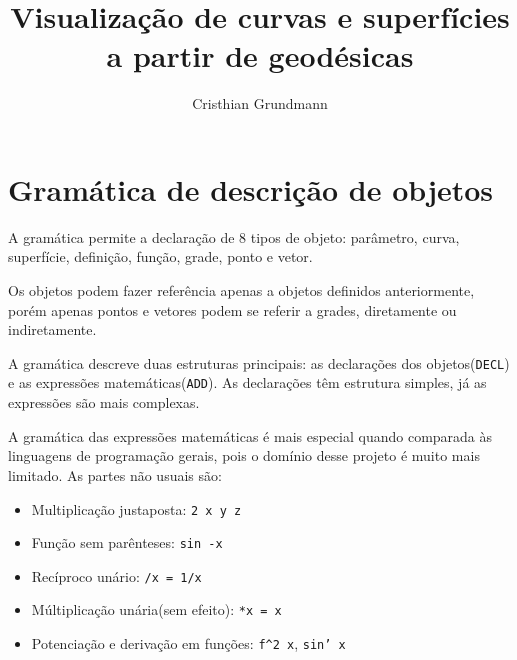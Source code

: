 \documentclass[10pt,a4paper,final]{article}
\author{Cristhian Grundmann}
\title{Visualização de curvas e superfícies a partir de geodésicas}
\begin{document}
\maketitle

\tableofcontents
\lstlistoflistings
\listoffigures
\listoftables


\section{Gramática de descrição de objetos}
A gramática permite a declaração de 8 tipos de objeto: parâmetro, curva, superfície, definição, função, grade, ponto e vetor.

Os objetos podem fazer referência apenas a objetos definidos anteriormente, porém apenas pontos e vetores podem se referir a grades, diretamente ou indiretamente.

A gramática descreve duas estruturas principais: as declarações dos objetos(\texttt{DECL}) e as expressões matemáticas(\texttt{ADD}). As declarações têm estrutura simples, já as expressões são mais complexas.

A gramática das expressões matemáticas é mais especial quando comparada às linguagens de programação gerais, pois o domínio desse projeto é muito mais limitado. As partes não usuais são:

\begin{itemize}
\item Multiplicação justaposta: \texttt{2 x y z}
\item Função sem parênteses: \texttt{sin -x}
\item Recíproco unário: \texttt{/x = 1/x}
\item Múltiplicação unária(sem efeito): \texttt{*x = x}
\item Potenciação e derivação em funções: \texttt{f\textasciicircum 2 x}, \texttt{sin' x}
\end{itemize}

\newpage

\end{document}
